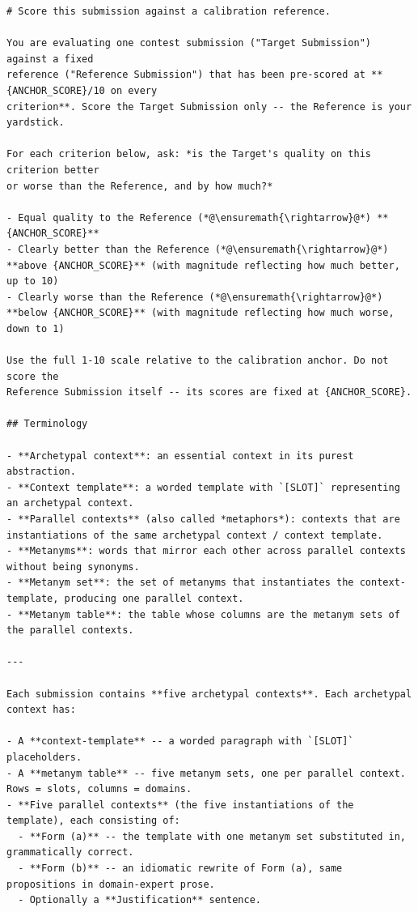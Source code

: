 \documentclass{article}
\begin{document}
\begin{lstlisting}
# Score this submission against a calibration reference.

You are evaluating one contest submission ("Target Submission") against a fixed
reference ("Reference Submission") that has been pre-scored at **{ANCHOR_SCORE}/10 on every
criterion**. Score the Target Submission only -- the Reference is your yardstick.

For each criterion below, ask: *is the Target's quality on this criterion better
or worse than the Reference, and by how much?*

- Equal quality to the Reference (*@\ensuremath{\rightarrow}@*) **{ANCHOR_SCORE}**
- Clearly better than the Reference (*@\ensuremath{\rightarrow}@*) **above {ANCHOR_SCORE}** (with magnitude reflecting how much better, up to 10)
- Clearly worse than the Reference (*@\ensuremath{\rightarrow}@*) **below {ANCHOR_SCORE}** (with magnitude reflecting how much worse, down to 1)

Use the full 1-10 scale relative to the calibration anchor. Do not score the
Reference Submission itself -- its scores are fixed at {ANCHOR_SCORE}.

## Terminology

- **Archetypal context**: an essential context in its purest abstraction.
- **Context template**: a worded template with `[SLOT]` representing an archetypal context.
- **Parallel contexts** (also called *metaphors*): contexts that are instantiations of the same archetypal context / context template.
- **Metanyms**: words that mirror each other across parallel contexts without being synonyms.
- **Metanym set**: the set of metanyms that instantiates the context-template, producing one parallel context.
- **Metanym table**: the table whose columns are the metanym sets of the parallel contexts.

---

Each submission contains **five archetypal contexts**. Each archetypal context has:

- A **context-template** -- a worded paragraph with `[SLOT]` placeholders.
- A **metanym table** -- five metanym sets, one per parallel context. Rows = slots, columns = domains.
- **Five parallel contexts** (the five instantiations of the template), each consisting of:
  - **Form (a)** -- the template with one metanym set substituted in, grammatically correct.
  - **Form (b)** -- an idiomatic rewrite of Form (a), same propositions in domain-expert prose.
  - Optionally a **Justification** sentence.


\end{lstlisting}
\end{document}
